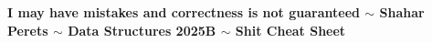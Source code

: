 \documentclass[]{article}
\theoremstyle{definition}
\begin{document}
	\vspace{4.5em}
	\textbf{I may have mistakes and correctness is not guaranteed $\sim$ Shahar Perets $\sim$ Data Structures 2025B $\sim$ Shit Cheat Sheet}
	
	\vspace{-4.5em}\vspace{-8em}
	
\end{document}
